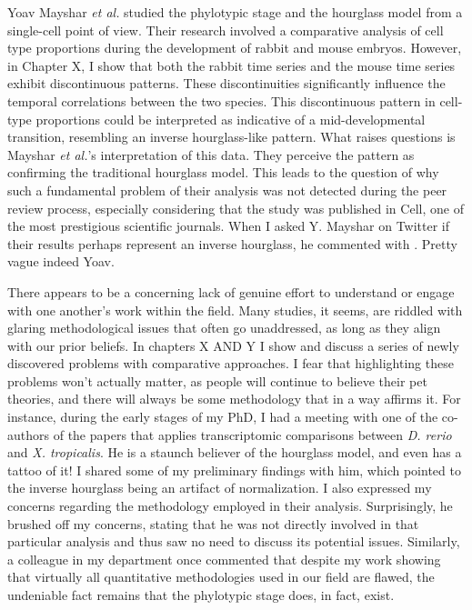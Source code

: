 Yoav Mayshar \textit{et al.} studied the phylotypic stage and the hourglass model from a single-cell point of view\cite{Mayshar2023}. Their research involved a comparative analysis of cell type proportions during the development of rabbit and mouse embryos. However, in Chapter X, I show that both the rabbit time series and the mouse time series exhibit discontinuous patterns. These discontinuities significantly influence the temporal correlations between the two species. This discontinuous pattern in cell-type proportions could be interpreted as indicative of a mid-developmental transition, resembling an inverse hourglass-like pattern. What raises questions is Mayshar \textit{et al.}'s interpretation of this data. They perceive the pattern as confirming the traditional hourglass model. This leads to the question of why such a fundamental problem of their analysis was not detected during the peer review process, especially considering that the study was published in Cell, one of the most prestigious scientific journals. When I asked Y. Mayshar on Twitter if their results perhaps represent an inverse hourglass, he commented with . Pretty vague indeed Yoav.

There appears to be a concerning lack of genuine effort to understand or engage with one another's work within the field. Many studies, it seems, are riddled with glaring methodological issues that often go unaddressed, as long as they align with our prior beliefs. In chapters X AND Y I show and discuss a series of newly discovered problems with comparative approaches. I fear that highlighting these problems won't actually matter, as people will continue to believe their pet theories, and there will always be some methodology that in a way affirms it. For instance, during the early stages of my PhD, I had a meeting with one of the co-authors of the papers that applies transcriptomic comparisons between \textit{D. rerio} and \textit{X. tropicalis}\cite{marletaz2018}. He is a staunch believer of the hourglass model, and even has a tattoo of it! I shared some of my preliminary findings with him, which pointed to the inverse hourglass being an artifact of normalization. I also expressed my concerns regarding the methodology employed in their analysis. Surprisingly, he brushed off my concerns, stating that he was not directly involved in that particular analysis and thus saw no need to discuss its potential issues. Similarly, a colleague in my department once commented that despite my work showing that virtually all quantitative methodologies used in our field are flawed, the undeniable fact remains that the phylotypic stage does, in fact, exist.

